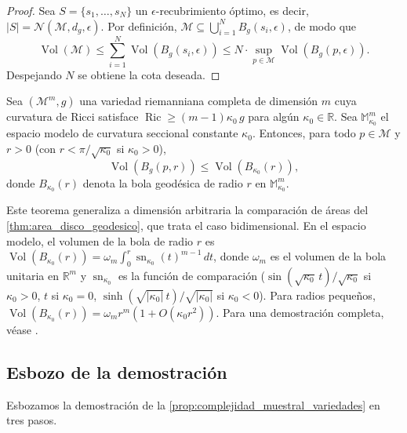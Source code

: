 \begin{proof}
Sea $S = \{s_1, \ldots, s_N\}$ un $\epsilon$-recubrimiento óptimo, es decir, $|S| = \mathcal{N}(\mathcal{M}, d_g, \epsilon)$. Por definición, $\mathcal{M} \subseteq \bigcup_{i=1}^N B_g(s_i, \epsilon)$, de modo que
\[
\operatorname{Vol}(\mathcal{M}) \leq \sum_{i=1}^N \operatorname{Vol}(B_g(s_i, \epsilon)) \leq N \cdot \sup_{p \in \mathcal{M}} \operatorname{Vol}(B_g(p, \epsilon)).
\]
Despejando $N$ se obtiene la cota deseada.
\end{proof}

\begin{theorem}\label{thm:bishop_gunther}
Sea $(\mathcal{M}^m, g)$ una variedad riemanniana completa de dimensión $m$ cuya curvatura de Ricci satisface $\operatorname{Ric} \geq (m-1)\kappa_0 \, g$ para algún $\kappa_0 \in \mathbb{R}$. Sea $\mathbb{M}^m_{\kappa_0}$ el espacio modelo de curvatura seccional constante $\kappa_0$. Entonces, para todo $p \in \mathcal{M}$ y $r > 0$ (con $r < \pi/\sqrt{\kappa_0}$ si $\kappa_0 > 0$),
\[
\operatorname{Vol}(B_g(p, r)) \leq \operatorname{Vol}(B_{\kappa_0}(r)),
\]
donde $B_{\kappa_0}(r)$ denota la bola geodésica de radio $r$ en $\mathbb{M}^m_{\kappa_0}$.
\end{theorem}

\begin{remark}\label{rem:bishop_gunther_contexto}
Este teorema generaliza a dimensión arbitraria la comparación de áreas del \autoref{thm:area_disco_geodesico}, que trata el caso bidimensional. En el espacio modelo, el volumen de la bola de radio $r$ es $\operatorname{Vol}(B_{\kappa_0}(r)) = \omega_m \int_0^r \operatorname{sn}_{\kappa_0}(t)^{m-1} \, dt$, donde $\omega_m$ es el volumen de la bola unitaria en $\mathbb{R}^m$ y $\operatorname{sn}_{\kappa_0}$ es la función de comparación ($\sin(\sqrt{\kappa_0}\,t)/\sqrt{\kappa_0}$ si $\kappa_0 > 0$, $t$ si $\kappa_0 = 0$, $\sinh(\sqrt{|\kappa_0|}\,t)/\sqrt{|\kappa_0|}$ si $\kappa_0 < 0$). Para radios pequeños, $\operatorname{Vol}(B_{\kappa_0}(r)) = \omega_m r^m (1 + O(\kappa_0 r^2))$. Para una demostración completa, véase \citet[Teorema~11.10]{lee2018introduction}.
\end{remark}

\subsection{Esbozo de la demostración}\label{subsec:complejidad_muestral_demo}

Esbozamos la demostración de la \autoref{prop:complejidad_muestral_variedades} en tres pasos.

